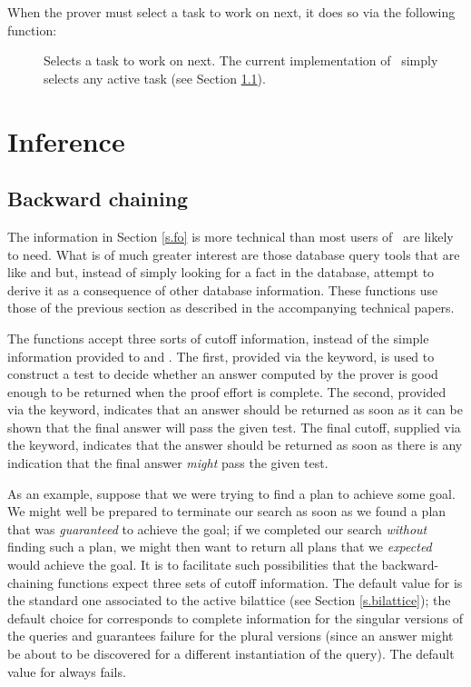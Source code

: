 When the prover must select a task to work on next, it does so via the
following function:
 \begin{description}
 \item [] Selects a task to work on next.  The
current implementation of \mvl\ simply selects any active task (see
Section \ref{s.bc}).
 \end{description}

\section{Inference}
\label{s.inf}

\subsection{Backward chaining}
\label{s.bc}

The information in Section \ref{s.fo} is more technical than most users
of \mvl\ are likely to need.  What is of much greater interest are those
database query tools that are like  and  but,
instead of simply looking for a fact in the database, attempt to derive
it as a consequence of other database information.  These functions use
those of the previous section as described in the accompanying technical
papers.

The functions accept three sorts of cutoff information, instead of the
simple information provided to  and .  The
first, provided via the  keyword, is used to construct a
test to decide whether an answer computed by the prover is good enough
to be returned when the proof effort is complete.  The second,
provided via the  keyword, indicates that an answer
should be returned as soon as it can be shown that the final answer
will pass the given test.  The final cutoff, supplied via the
 keyword, indicates that the answer should be returned
as soon as there is any indication that the final answer {\em might\/}
pass the given test.

As an example, suppose that we were trying to find a plan to achieve some
goal.  We might well be prepared to terminate our search as soon as we found
a plan that was {\em guaranteed\/} to achieve the goal; if we completed our
search {\em without\/} finding such a plan, we might then want to return
all plans that we {\em expected\/} would achieve the goal.  It is to
facilitate such possibilities that the backward-chaining functions expect
three sets of cutoff information.  The default value for 
is the standard one associated to the active bilattice (see Section
\ref{s.bilattice}); the default choice for  corresponds
to complete information for the singular versions of the queries and
guarantees failure for the plural versions (since an answer might be
about to be discovered for a different instantiation of the query).
The default value for  always fails.

